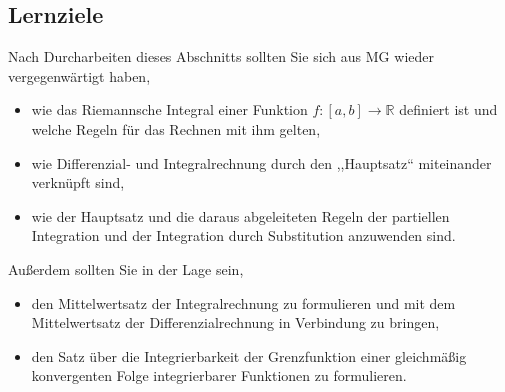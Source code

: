 \documentclass[a4paper,12pt]{article}
\begin{document}
\begin{center}
\end{center}

\subsection*{Lernziele}

Nach Durcharbeiten dieses Abschnitts sollten Sie sich aus MG wieder
vergegenwärtigt haben,
\begin{itemize}
  \item wie das Riemannsche Integral einer Funktion $f: [a,b] \to \mathbb{R}$ definiert
        ist und welche Regeln für das Rechnen mit ihm gelten,
  \item wie Differenzial- und Integralrechnung durch den ,,Hauptsatz``
        miteinander verknüpft sind,
  \item wie der Hauptsatz und die daraus abgeleiteten Regeln der partiellen
        Integration und der Integration durch Substitution anzuwenden sind.
\end{itemize}
Außerdem sollten Sie in der Lage sein,
\begin{itemize}
  \item den Mittelwertsatz der Integralrechnung zu formulieren und mit dem
        Mittelwertsatz der Differenzialrechnung in Verbindung zu bringen,
  \item den Satz über die Integrierbarkeit der Grenzfunktion einer gleichmäßig
        konvergenten Folge integrierbarer Funktionen zu formulieren.
\end{itemize}
\end{document}
